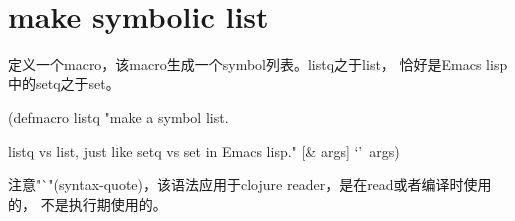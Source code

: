 ﻿\documentclass[a4paper,11pt]{article}
\begin{document}
  \tt %
  \pagestyle{header}
  \sybmaketitle
  \tableofcontents
  \newpage

  \pagestyle{main}
  \setcounter{page}{1}

  \section[make symbolic list]{make symbolic list}
  定义一个macro，该macro生成一个symbol列表。listq之于list，
  恰好是Emacs lisp中的setq之于set。

  \begin{schemecode}
    (defmacro listq
      "make a symbol list.
      
      listq vs list, just like setq vs set in Emacs lisp."
      [& args]
      `'~args)    
    \end{schemecode}

    注意"`"(syntax-quote)，该语法应用于clojure reader，是在read或者编译时使用的，
    不是执行期使用的。
\end{document}
